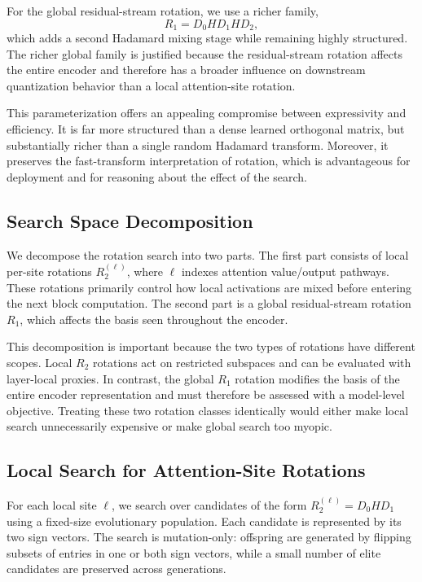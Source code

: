 \documentclass[11pt]{article}
\begin{document}
For the global residual-stream rotation, we use a richer family,
\begin{equation}
R_1 = D_0 H D_1 H D_2,
\end{equation}
which adds a second Hadamard mixing stage while remaining highly structured. The richer global family is justified because the residual-stream rotation affects the entire encoder and therefore has a broader influence on downstream quantization behavior than a local attention-site rotation.

This parameterization offers an appealing compromise between expressivity and efficiency. It is far more structured than a dense learned orthogonal matrix, but substantially richer than a single random Hadamard transform. Moreover, it preserves the fast-transform interpretation of rotation, which is advantageous for deployment and for reasoning about the effect of the search.

\subsection{Search Space Decomposition}
We decompose the rotation search into two parts. The first part consists of local per-site rotations $R_2^{(\ell)}$, where $\ell$ indexes attention value/output pathways. These rotations primarily control how local activations are mixed before entering the next block computation. The second part is a global residual-stream rotation $R_1$, which affects the basis seen throughout the encoder.

This decomposition is important because the two types of rotations have different scopes. Local $R_2$ rotations act on restricted subspaces and can be evaluated with layer-local proxies. In contrast, the global $R_1$ rotation modifies the basis of the entire encoder representation and must therefore be assessed with a model-level objective. Treating these two rotation classes identically would either make local search unnecessarily expensive or make global search too myopic.

\subsection{Local Search for Attention-Site Rotations}
For each local site $\ell$, we search over candidates of the form $R_2^{(\ell)} = D_0 H D_1$ using a fixed-size evolutionary population. Each candidate is represented by its two sign vectors. The search is mutation-only: offspring are generated by flipping subsets of entries in one or both sign vectors, while a small number of elite candidates are preserved across generations.
\end{document}
